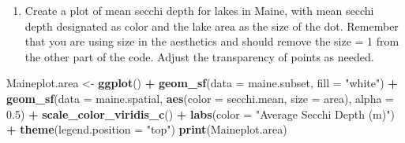 \documentclass[]{article}
\newenvironment{Shaded}{\begin{snugshade}}{\end{snugshade}}
\newcommand{\DataTypeTok}[1]{\textcolor[rgb]{0.13,0.29,0.53}{#1}}
\newcommand{\DecValTok}[1]{\textcolor[rgb]{0.00,0.00,0.81}{#1}}
\newcommand{\FloatTok}[1]{\textcolor[rgb]{0.00,0.00,0.81}{#1}}
\newcommand{\KeywordTok}[1]{\textcolor[rgb]{0.13,0.29,0.53}{\textbf{#1}}}
\newcommand{\NormalTok}[1]{#1}
\newcommand{\OperatorTok}[1]{\textcolor[rgb]{0.81,0.36,0.00}{\textbf{#1}}}
\newcommand{\StringTok}[1]{\textcolor[rgb]{0.31,0.60,0.02}{#1}}
\providecommand{\tightlist}{%
  \setlength{\itemsep}{0pt}\setlength{\parskip}{0pt}}
\begin{document}
\begin{Shaded}
\end{Shaded}

\begin{enumerate}
\def\labelenumi{\arabic{enumi}.}
\setcounter{enumi}{5}
\tightlist
\item
  Create a plot of mean secchi depth for lakes in Maine, with mean
  secchi depth designated as color and the lake area as the size of the
  dot. Remember that you are using size in the aesthetics and should
  remove the size = 1 from the other part of the code. Adjust the
  transparency of points as needed.
\end{enumerate}

\begin{Shaded}
\begin{Highlighting}[]
\NormalTok{Maineplot.area <-}\StringTok{ }\KeywordTok{ggplot}\NormalTok{() }\OperatorTok{+}
\StringTok{  }\KeywordTok{geom_sf}\NormalTok{(}\DataTypeTok{data =}\NormalTok{ maine.subset, }\DataTypeTok{fill =} \StringTok{"white"}\NormalTok{) }\OperatorTok{+}
\StringTok{  }\KeywordTok{geom_sf}\NormalTok{(}\DataTypeTok{data =}\NormalTok{ maine.spatial, }\KeywordTok{aes}\NormalTok{(}\DataTypeTok{color =}\NormalTok{ secchi.mean, }\DataTypeTok{size =}\NormalTok{ area), }
          \DataTypeTok{alpha =} \FloatTok{0.5}\NormalTok{) }\OperatorTok{+}
\StringTok{  }\KeywordTok{scale_color_viridis_c}\NormalTok{() }\OperatorTok{+}
\StringTok{  }\KeywordTok{labs}\NormalTok{(}\DataTypeTok{color =} \StringTok{"Average Secchi Depth (m)"}\NormalTok{) }\OperatorTok{+}
\StringTok{  }\KeywordTok{theme}\NormalTok{(}\DataTypeTok{legend.position =} \StringTok{"top"}\NormalTok{)}
\KeywordTok{print}\NormalTok{(Maineplot.area)}
\end{Highlighting}
\end{Shaded}
\end{document}
